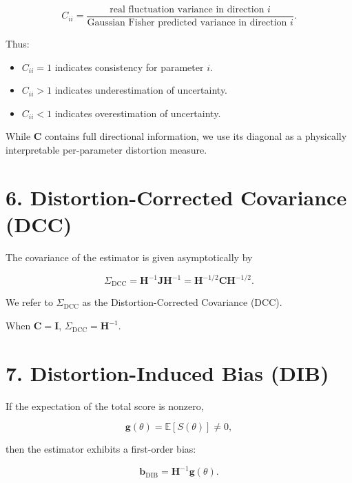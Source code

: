 \documentclass[11pt]{article}
\begin{document}
\begin{equation}
C_{ii}
=
\frac{\text{real fluctuation variance in direction } i}
     {\text{Gaussian Fisher predicted variance in direction } i}.
\end{equation}

Thus:

\begin{itemize}
\item $C_{ii} = 1$ indicates consistency for parameter $i$.
\item $C_{ii} > 1$ indicates underestimation of uncertainty.
\item $C_{ii} < 1$ indicates overestimation of uncertainty.
\end{itemize}

While $\mathbf C$ contains full directional information, we use its diagonal
as a physically interpretable per-parameter distortion measure.

\section*{6. Distortion-Corrected Covariance (DCC)}

The covariance of the estimator is given asymptotically by

\begin{equation}
\Sigma_{\mathrm{DCC}}
=
\mathbf H^{-1}
\mathbf J
\mathbf H^{-1}
=
\mathbf H^{-1/2}
\mathbf C
\mathbf H^{-1/2}.
\end{equation}

We refer to $\Sigma_{\mathrm{DCC}}$ as the Distortion-Corrected Covariance (DCC).

When $\mathbf C = \mathbf I$, $\Sigma_{\mathrm{DCC}} = \mathbf H^{-1}$.

\section*{7. Distortion-Induced Bias (DIB)}

If the expectation of the total score is nonzero,

\begin{equation}
\mathbf g(\theta) = \mathbb{E}[S(\theta)] \neq 0,
\end{equation}

then the estimator exhibits a first-order bias:

\begin{equation}
\mathbf b_{\mathrm{DIB}}
=
\mathbf H^{-1} \mathbf g(\theta).
\end{equation}
\end{document}
